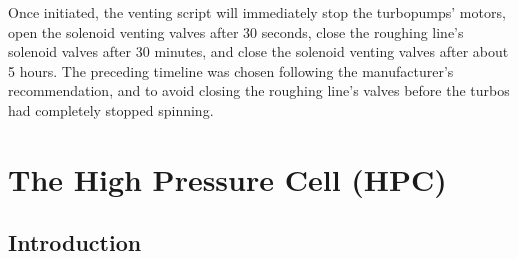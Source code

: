 Once initiated, the venting script will immediately stop the turbopumps' motors, open the solenoid venting valves after 30 seconds, close the roughing line's solenoid valves after 30 minutes, and close the solenoid venting valves after about 5 hours. The preceding timeline was chosen following the manufacturer's recommendation, and to avoid closing the roughing line's valves before the turbos had completely stopped spinning. 
%
%
%
%
%
%
%
%

\section{The High Pressure Cell (HPC)}
\label{app:HPC_instructions}

\subsection{Introduction}

